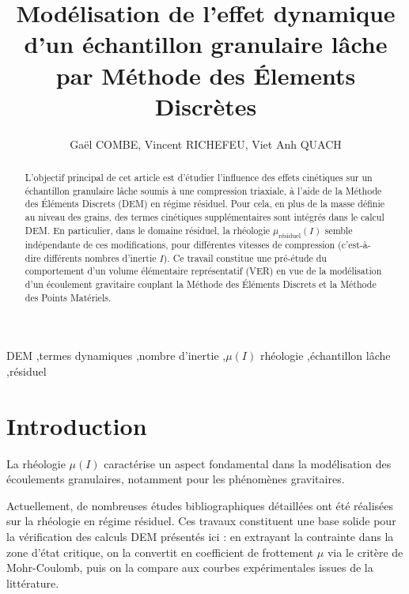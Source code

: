 \documentclass[5p,authoryear,square]{elsarticle}
\begin{document}
\begin{frontmatter}

\title{\textbf{Modélisation de l'effet dynamique d'un échantillon granulaire lâche par Méthode des Élements Discrètes}}

\author{Gaël COMBE, Vincent RICHEFEU, Viet Anh QUACH}
\address{Laboratoire 3SR, Université Grenoble Alpes}


\begin{abstract}

L'objectif principal de cet article est d'étudier l'influence des effets cinétiques sur un échantillon granulaire lâche soumis à une compression triaxiale, à l'aide de la Méthode des Éléments Discrets (DEM) en régime résiduel.
Pour cela, en plus de la masse définie au niveau des grains, des termes cinétiques supplémentaires sont intégrés dans le calcul DEM.
En particulier, dans le domaine résiduel, la rhéologie $\mu_{\text{résiduel}}(I)$ semble indépendante de ces modifications, pour différentes vitesses de compression (c'est-à-dire différents nombres d'inertie $I$).
Ce travail constitue une pré-étude du comportement d'un volume élémentaire représentatif (VER) en vue de la modélisation d'un écoulement gravitaire couplant la Méthode des Éléments Discrets et la Méthode des Points Matériels.

\end{abstract}

\begin{keyword}
DEM \sep termes dynamiques \sep nombre d'inertie \sep $\mu(I)$ rhéologie \sep échantillon lâche \sep résiduel
\end{keyword}

\end{frontmatter}

\section{Introduction}\label{introduction}
La rhéologie $\mu(I)$ caractérise un aspect fondamental dans la modélisation des écoulements granulaires, notamment pour les phénomènes gravitaires.

Actuellement, de nombreuses études bibliographiques détaillées ont été réalisées sur la rhéologie en régime résiduel. Ces travaux constituent une base solide pour la vérification des calculs DEM présentés ici : en extrayant la contrainte dans la zone d’état critique, on la convertit en coefficient de frottement $\mu$ via le critère de Mohr-Coulomb, puis on la compare aux courbes expérimentales issues de la littérature.
\end{document}
